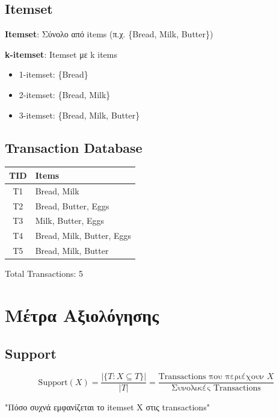 \subsection{Itemset}

\begin{definitionbox}[Itemset]
\textbf{Itemset}: Σύνολο από items (π.χ. \{Bread, Milk, Butter\})

\textbf{k-itemset}: Itemset με k items
\begin{itemize}
    \item 1-itemset: \{Bread\}
    \item 2-itemset: \{Bread, Milk\}
    \item 3-itemset: \{Bread, Milk, Butter\}
\end{itemize}
\end{definitionbox}

\subsection{Transaction Database}

\begin{center}
\begin{tabular}{cl}
\toprule
\textbf{TID} & \textbf{Items} \\
\midrule
T1 & Bread, Milk \\
T2 & Bread, Butter, Eggs \\
T3 & Milk, Butter, Eggs \\
T4 & Bread, Milk, Butter, Eggs \\
T5 & Bread, Milk, Butter \\
\bottomrule
\end{tabular}

\vspace{0.3cm}
Total Transactions: 5
\end{center}

\section{Μέτρα Αξιολόγησης}

\subsection{Support}

\begin{formulabox}[Support]
\begin{equation}
\text{Support}(X) = \frac{|\{T : X \subseteq T\}|}{|T|} = \frac{\text{Transactions που περιέχουν } X}{\text{Συνολικές Transactions}}
\end{equation}

"Πόσο συχνά εμφανίζεται το itemset X στις transactions"
\end{formulabox}

